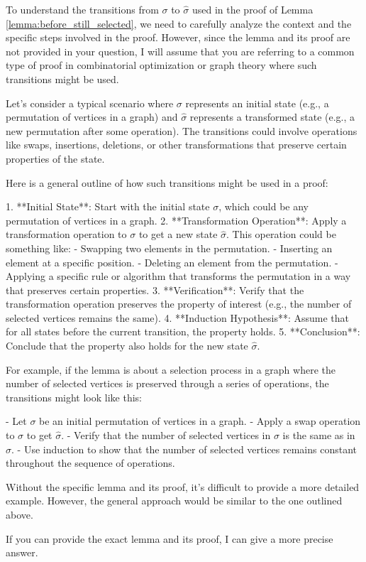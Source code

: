 To understand the transitions from \(\sigma\) to \(\hat{\sigma}\) used in the proof of Lemma \ref{lemma:before_still_selected}, we need to carefully analyze the context and the specific steps involved in the proof. However, since the lemma and its proof are not provided in your question, I will assume that you are referring to a common type of proof in combinatorial optimization or graph theory where such transitions might be used.

Let's consider a typical scenario where \(\sigma\) represents an initial state (e.g., a permutation of vertices in a graph) and \(\hat{\sigma}\) represents a transformed state (e.g., a new permutation after some operation). The transitions could involve operations like swaps, insertions, deletions, or other transformations that preserve certain properties of the state.

Here is a general outline of how such transitions might be used in a proof:

1. **Initial State**: Start with the initial state \(\sigma\), which could be any permutation of vertices in a graph.
2. **Transformation Operation**: Apply a transformation operation to \(\sigma\) to get a new state \(\hat{\sigma}\). This operation could be something like:
   - Swapping two elements in the permutation.
   - Inserting an element at a specific position.
   - Deleting an element from the permutation.
   - Applying a specific rule or algorithm that transforms the permutation in a way that preserves certain properties.
3. **Verification**: Verify that the transformation operation preserves the property of interest (e.g., the number of selected vertices remains the same).
4. **Induction Hypothesis**: Assume that for all states before the current transition, the property holds.
5. **Conclusion**: Conclude that the property also holds for the new state \(\hat{\sigma}\).

For example, if the lemma is about a selection process in a graph where the number of selected vertices is preserved through a series of operations, the transitions might look like this:

- Let \(\sigma\) be an initial permutation of vertices in a graph.
- Apply a swap operation to \(\sigma\) to get \(\hat{\sigma}\).
- Verify that the number of selected vertices in \(\sigma\) is the same as in \(\hat{\sigma}\).
- Use induction to show that the number of selected vertices remains constant throughout the sequence of operations.

Without the specific lemma and its proof, it's difficult to provide a more detailed example. However, the general approach would be similar to the one outlined above.

If you can provide the exact lemma and its proof, I can give a more precise answer.